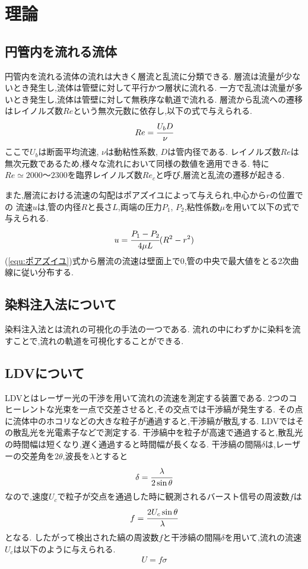 \section{理論}
\subsection{円管内を流れる流体\cite{rikougaku}}
円管内を流れる流体の流れは大きく層流と乱流に分類できる.
層流は流量が少ないとき発生し,流体は管壁に対して平行かつ層状に流れる.
一方で乱流は流量が多いとき発生し,流体は管壁に対して無秩序な軌道で流れる.
層流から乱流への遷移はレイノルズ数$Re$という無次元数に依存し,以下の式で与えられる.
\begin{align}
  \label{equ:レイノルズ}
  Re=\cfrac{U_bD}{\nu}
\end{align}
ここで$U_b$は断面平均流速, $\nu$は動粘性系数, $D$は管内径である.
レイノルズ数$Re$は無次元数であるため,様々な流れにおいて同様の数値を適用できる.
特に$Re\simeq2000～2300$を臨界レイノルズ数$Re_c$と呼び,層流と乱流の遷移が起きる.

また,層流における流速の勾配はポアズイユによって与えられ,中心から$r$の位置での
流速$u$は,管の内径$R$と長さ$L$,両端の圧力$P_1$, $P_2$,粘性係数$\mu$を用いて以下の式で与えられる.
\begin{align}
  \label{equ:ポアズイユ}
  u=\cfrac{P_1-P_2}{4\mu L}(R^2-r^2)
\end{align}
(\ref{equ:ポアズイユ})式から層流の流速は壁面上で0,管の中央で最大値をとる2次曲線に従い分布する.
\subsection{染料注入法について\cite{rikougaku}}
染料注入法とは流れの可視化の手法の一つである.
流れの中にわずかに染料を流すことで,流れの軌道を可視化することができる.
\subsection{LDVについて\cite{LDVLaser}}
LDVとはレーザー光の干渉を用いて流れの流速を測定する装置である.
2つのコヒーレントな光束を一点で交差させると,その交点では干渉縞が発生する.
その点に流体中のホコリなどの大きな粒子が通過すると,干渉縞が散乱する.
LDVではその散乱光を光電素子などで測定する.
干渉縞中を粒子が高速で通過すると,散乱光の時間幅は短くなり,遅く通過すると時間幅が長くなる.
干渉縞の間隔$\delta$は,レーザーの交差角を$2\theta$,波長を$\lambda$とすると
\begin{align}
  \delta=\cfrac{\lambda}{2\sin\theta}
\end{align}
なので,速度$U_c$で粒子が交点を通過した時に観測されるバースト信号の周波数$f$は
\begin{align}
  f=\cfrac{2U_c\sin\theta}{\lambda}
\end{align}
となる.
したがって検出された縞の周波数$f$と干渉縞の間隔$\delta$を用いて,流れの流速$U_c$は以下のように与えられる.
\begin{align}
  U=f\sigma
\end{align}